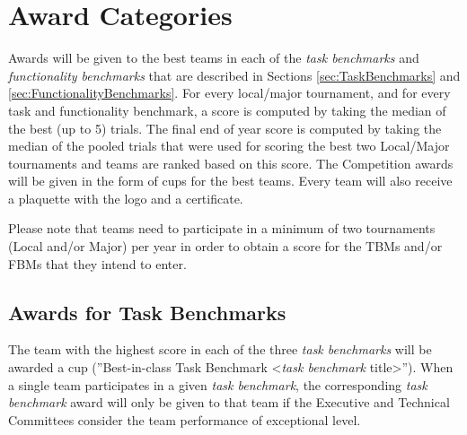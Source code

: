 
\clearpage{}
\section{\erlir Award Categories}
\label{sec:AwardCategories}
Awards will be given to the best teams in each of the \erlir \emph{task benchmarks} and \emph{functionality benchmarks} that are described in Sections \ref{sec:TaskBenchmarks} and \ref{sec:FunctionalityBenchmarks}. 
For every local/major tournament, and for every task and functionality benchmark, a score is computed by taking the median of the best (up to 5) trials. The final end of year score is computed by taking the median of the pooled trials that were used for scoring the best two Local/Major tournaments and teams are ranked based on this score.
The \erl Competition awards will be given in the form of cups for the best teams. Every team will also receive a plaquette with the \erl logo and a certificate.

Please note that teams need to participate in a minimum of two tournaments (Local and/or Major) per year in order to obtain a  score for the TBMs and/or FBMs that they intend to enter.


\subsection{Awards for Task Benchmarks}
\label{sec:AwardTBMs}
The team with the highest score in each of the three \emph{task benchmarks} will be awarded a cup (''\erlir Best-in-class Task Benchmark <\emph{task benchmark} title>'').
When a single team participates in a given \emph{task benchmark}, the corresponding \emph{task benchmark} award will only be given to that team if the Executive and Technical Committees consider the team performance of exceptional level. 

